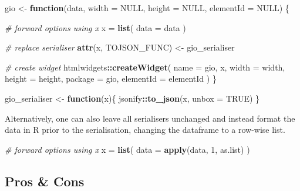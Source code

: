 \documentclass[
]{krantz}
\makeatletter
\newenvironment{Shaded}{\begin{snugshade}}{\end{snugshade}}
\newcommand{\CommentTok}[1]{\textcolor[rgb]{0.37,0.37,0.37}{\textit{#1}}}
\newcommand{\ControlFlowTok}[1]{\textcolor[rgb]{0.27,0.27,0.27}{\textbf{#1}}}
\newcommand{\DataTypeTok}[1]{\textcolor[rgb]{0.27,0.27,0.27}{#1}}
\newcommand{\DecValTok}[1]{\textcolor[rgb]{0.06,0.06,0.06}{#1}}
\newcommand{\KeywordTok}[1]{\textcolor[rgb]{0.27,0.27,0.27}{\textbf{#1}}}
\newcommand{\NormalTok}[1]{#1}
\newcommand{\OperatorTok}[1]{\textcolor[rgb]{0.43,0.43,0.43}{\textbf{#1}}}
\newcommand{\OtherTok}[1]{\textcolor[rgb]{0.37,0.37,0.37}{#1}}
\newcommand{\StringTok}[1]{\textcolor[rgb]{0.5,0.5,0.5}{#1}}
\newenvironment{kframe}{%
\medskip{}
\setlength{\fboxsep}{.8em}
 \def\at@end@of@kframe{}%
 \ifinner\ifhmode%
  \def\at@end@of@kframe{\end{minipage}}%
  \begin{minipage}{\columnwidth}%
 \fi\fi%
 \def\FrameCommand##1{\hskip\@totalleftmargin \hskip-\fboxsep
 \colorbox{shadecolor}{##1}\hskip-\fboxsep
     \hskip-\linewidth \hskip-\@totalleftmargin \hskip\columnwidth}%
 \MakeFramed {\advance\hsize-\width
   \@totalleftmargin\z@ \linewidth\hsize
   \@setminipage}}%
 {\par\unskip\endMakeFramed%
 \at@end@of@kframe}
\renewenvironment{Shaded}{\begin{kframe}}{\end{kframe}}
\makeatother
\begin{document}
\begin{Shaded}
\begin{Highlighting}[]
\NormalTok{gio <{-}}\StringTok{ }\ControlFlowTok{function}\NormalTok{(data, }\DataTypeTok{width =} \OtherTok{NULL}\NormalTok{, }\DataTypeTok{height =} \OtherTok{NULL}\NormalTok{, }\DataTypeTok{elementId =} \OtherTok{NULL}\NormalTok{) \{}

  \CommentTok{\# forward options using x}
\NormalTok{  x =}\StringTok{ }\KeywordTok{list}\NormalTok{(}
    \DataTypeTok{data =}\NormalTok{ data}
\NormalTok{  )}

  \CommentTok{\# replace serialiser}
  \KeywordTok{attr}\NormalTok{(x, }\StringTok{\textquotesingle{}TOJSON\_FUNC\textquotesingle{}}\NormalTok{) <{-}}\StringTok{ }\NormalTok{gio\_serialiser}

  \CommentTok{\# create widget}
\NormalTok{  htmlwidgets}\OperatorTok{::}\KeywordTok{createWidget}\NormalTok{(}
    \DataTypeTok{name =} \StringTok{\textquotesingle{}gio\textquotesingle{}}\NormalTok{,}
\NormalTok{    x,}
    \DataTypeTok{width =}\NormalTok{ width,}
    \DataTypeTok{height =}\NormalTok{ height,}
    \DataTypeTok{package =} \StringTok{\textquotesingle{}gio\textquotesingle{}}\NormalTok{,}
    \DataTypeTok{elementId =}\NormalTok{ elementId}
\NormalTok{  )}
\NormalTok{\}}

\NormalTok{gio\_serialiser <{-}}\StringTok{ }\ControlFlowTok{function}\NormalTok{(x)\{}
\NormalTok{  jsonify}\OperatorTok{::}\KeywordTok{to\_json}\NormalTok{(x, }\DataTypeTok{unbox =} \OtherTok{TRUE}\NormalTok{)}
\NormalTok{\}}
\end{Highlighting}
\end{Shaded}

Alternatively, one can also leave all serialisers unchanged and instead format the data in R prior to the serialisation, changing the dataframe to a row-wise list.

\begin{Shaded}
\begin{Highlighting}[]
\CommentTok{\# forward options using x}
\NormalTok{x =}\StringTok{ }\KeywordTok{list}\NormalTok{(}
  \DataTypeTok{data =} \KeywordTok{apply}\NormalTok{(data, }\DecValTok{1}\NormalTok{, as.list)}
\NormalTok{)}
\end{Highlighting}
\end{Shaded}

\hypertarget{pros-cons}{%
\subsection*{Pros \& Cons}\label{pros-cons}}
\end{document}
